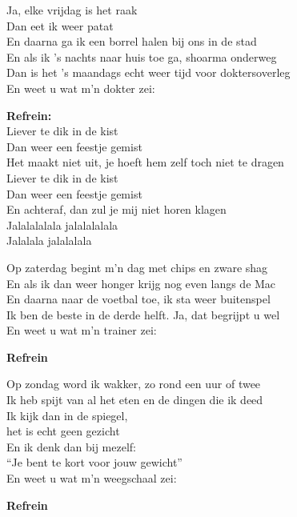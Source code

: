 Ja, elke vrijdag is het raak\\
Dan eet ik weer patat\\
En daarna ga ik een borrel halen bij ons in de stad\\
En als ik ’s nachts naar huis toe ga, shoarma onderweg\\
Dan is het ’s maandags echt weer tijd voor doktersoverleg\\
En weet u wat m’n dokter zei:

\textbf{Refrein:}\\
Liever te dik in de kist\\
Dan weer een feestje gemist\\
Het maakt niet uit, je hoeft hem zelf toch
niet te dragen\\
Liever te dik in de kist\\
Dan weer een feestje gemist\\
En achteraf, dan zul je mij niet horen klagen\\
Jalalalalala jalalalalala\\
Jalalala jalalalala

Op zaterdag begint m’n dag met chips en zware shag\\
En als ik dan weer honger krijg nog even langs de Mac\\
En daarna naar de voetbal toe, ik sta weer buitenspel\\
Ik ben de beste in de derde helft. Ja, dat begrijpt u wel\\
En weet u wat m’n trainer zei:

\textbf{Refrein}

Op zondag word ik wakker, zo rond een uur of twee\\
Ik heb spijt van al het eten en de dingen die ik deed\\
Ik kijk dan in de spiegel,\\
het is echt geen gezicht\\
En ik denk dan bij mezelf:\\
“Je bent te kort voor jouw gewicht”\\
En weet u wat m’n weegschaal zei:

\textbf{Refrein}